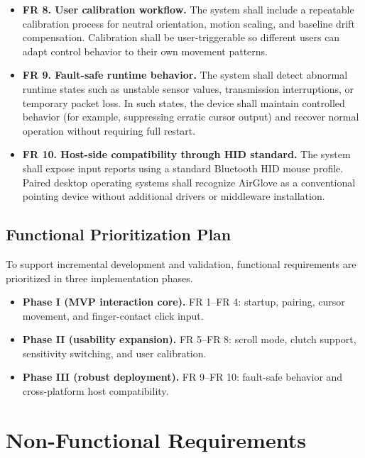 \begin{itemize}
    \item \textbf{FR 8. User calibration workflow.} The system shall include a repeatable calibration process for neutral orientation, motion scaling, and baseline drift compensation. Calibration shall be user-triggerable so different users can adapt control behavior to their own movement patterns.

    \item \textbf{FR 9. Fault-safe runtime behavior.} The system shall detect abnormal runtime states such as unstable sensor values, transmission interruptions, or temporary packet loss. In such states, the device shall maintain controlled behavior (for example, suppressing erratic cursor output) and recover normal operation without requiring full restart.

    \item \textbf{FR 10. Host-side compatibility through HID standard.} The system shall expose input reports using a standard Bluetooth HID mouse profile. Paired desktop operating systems shall recognize AirGlove as a conventional pointing device without additional drivers or middleware installation.
\end{itemize}

\subsection{Functional Prioritization Plan}

To support incremental development and validation, functional requirements are prioritized in three implementation phases.

\begin{itemize}
    \item \textbf{Phase I (MVP interaction core).} FR 1--FR 4: startup, pairing, cursor movement, and finger-contact click input.
    \item \textbf{Phase II (usability expansion).} FR 5--FR 8: scroll mode, clutch support, sensitivity switching, and user calibration.
    \item \textbf{Phase III (robust deployment).} FR 9--FR 10: fault-safe behavior and cross-platform host compatibility.
\end{itemize}
    
\section{Non-Functional Requirements}





